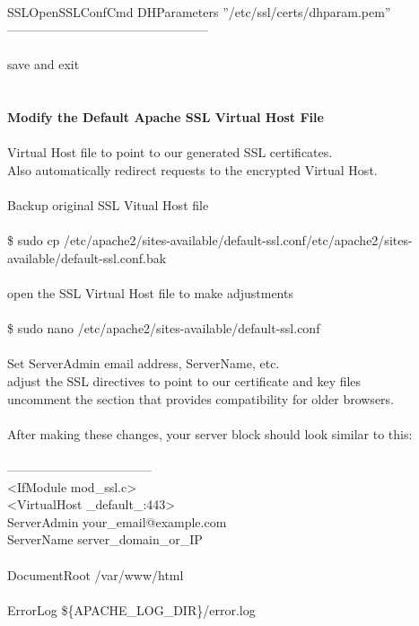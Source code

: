 \documentclass[10pt,a4paper]{article}
\begin{document}
{{{{{{{{{{{{{{{{\\
SSLOpenSSLConfCmd DHParameters ''/etc/ssl/certs/dhparam.pem''\\
------------------------------------------------\\
\\
save and exit\\
\\
\\
\textbf{Modify the Default Apache SSL Virtual Host File}}{\large \\
\\
Virtual Host file to point to our generated SSL certificates.\\
Also automatically redirect requests to the encrypted Virtual Host.\\
\\
Backup original SSL Vitual Host file\\
\\
\$ sudo cp /etc/apache2/sites-available/default-ssl.conf}{\large /etc/apache2/sites-available/default-ssl.conf.bak}{\large \\
\\
open the SSL Virtual Host file to make adjustments\\
\\
\$ sudo nano /etc/apache2/sites-available/default-ssl.conf}{\large \\
\\
Set ServerAdmin email address, ServerName, etc.\\
adjust the SSL directives to point to our certificate and key files\\
uncomment the section that provides compatibility for older browsers.\\
\\
After making these changes, your server block should look similar to this:\\
\\
-----------------------------------\\
<IfModule mod\_ssl.c>\\
        <VirtualHost \_default\_:443>\\
                ServerAdmin your\_email@example.com}{\large \\
                ServerName server\_domain\_or\_IP\\
\\
                DocumentRoot /var/www/html}{\large \\
\\
                ErrorLog \$\{APACHE\_LOG\_DIR\}/error.log\\
}}}}}}}}}}}}}}}}
\end{document}
